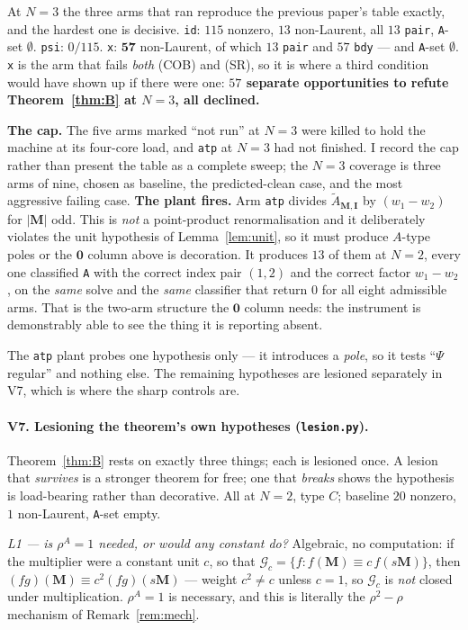 \documentclass[11pt]{article}
\theoremstyle{plain}
\theoremstyle{definition}
\theoremstyle{remark}
\theoremstyle{plain}
\newcommand{\bI}{\mathbf{I}}
\newcommand{\bM}{\mathbf{M}}
\newcommand{\At}{\widetilde{A}}
\newcommand{\Gkm}{\mathcal{G}}
\begin{document}
At $N=3$ the three arms that ran reproduce the previous paper's table exactly, and
the hardest one is decisive.  \texttt{id}: $115$ nonzero, $13$ non-Laurent, all
$13$ \texttt{pair}, \texttt{A}-set $\emptyset$.  \texttt{psi}: $0/115$.
\texttt{x}: $\mathbf{57}$ non-Laurent, of which $13$ \texttt{pair} and $57$
\texttt{bdy} --- and \texttt{A}-set $\emptyset$.  \texttt{x} is the arm that fails
\emph{both} (COB) and (SR), so it is where a third condition would have shown up if
there were one: \textbf{$57$ separate opportunities to refute
Theorem~\ref{thm:B} at $N=3$, all declined.}

\textbf{The cap.}  The five arms marked ``not run'' at $N=3$ were killed to hold
the machine at its four-core load, and \texttt{atp} at $N=3$ had not finished.  I
record the cap rather than present the table as a complete sweep; the $N=3$
coverage is three arms of nine, chosen as baseline, the predicted-clean case, and
the most aggressive failing case.
\textbf{The plant fires.}  Arm \texttt{atp} divides $\At_{\bM,\bI}$ by
$(w_1-w_2)$ for $|\bM|$ odd.  This is \emph{not} a point-product renormalisation
and it deliberately violates the unit hypothesis of Lemma~\ref{lem:unit}, so it
must produce $A$-type poles or the $\mathbf{0}$ column above is decoration.  It
produces $13$ of them at $N=2$, every one classified \texttt{A} with the correct
index pair $(1,2)$ and the correct factor $w_1-w_2$, on the \emph{same} solve and
the \emph{same} classifier that return $0$ for all eight admissible arms.  That
is the two-arm structure the $\mathbf{0}$ column needs: the instrument is
demonstrably able to see the thing it is reporting absent.

The \texttt{atp} plant probes one hypothesis only --- it introduces a \emph{pole},
so it tests ``$\Psi$ regular'' and nothing else.  The remaining hypotheses are
lesioned separately in V7, which is where the sharp controls are.

\paragraph{V7. Lesioning the theorem's own hypotheses (\texttt{lesion.py}).}
Theorem~\ref{thm:B} rests on exactly three things; each is lesioned once.  A
lesion that \emph{survives} is a stronger theorem for free; one that
\emph{breaks} shows the hypothesis is load-bearing rather than decorative.  All at
$N=2$, type $C$; baseline $20$ nonzero, $1$ non-Laurent, \texttt{A}-set empty.

\emph{L1 --- is $\rho^A=1$ needed, or would any constant do?}  Algebraic, no
computation: if the multiplier were a constant unit $c$, so that
$\Gkm_c=\{f:f(\bM)\equiv c\,f(s\bM)\}$, then
$(fg)(\bM)\equiv c^{2}(fg)(s\bM)$ --- weight $c^{2}\neq c$ unless $c=1$, so
$\Gkm_c$ is \emph{not} closed under multiplication.  $\rho^A=1$ is necessary, and
this is literally the $\rho^2-\rho$ mechanism of Remark~\ref{rem:mech}.
\end{document}
